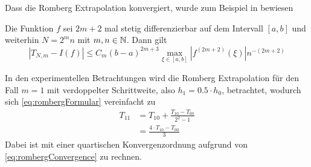 Dass die Romberg Extrapolation konvergiert, wurde zum Beispiel in \cite{von1993short} bewiesen 
\begin{theorem}\label{thm:rombergConvergence}
 Die Funktion $f$ sei $2m+2$ mal stetig differenzierbar auf dem Intervall $[a,b]$ und weiterhin $N=2^mn$ mit $m,n\in \mathbb{N}$. Dann gilt
 \begin{equation}\label{eq:rombergConvergence}
  |T_{N,m} - I(f)| \leq C_m(b-a)^{2m+3}\max_{\xi \in[a,b]}|f^{(2m+2)}(\xi)|n^{-(2m+2)}
 \end{equation}
\end{theorem}

In den experimentellen Betrachtungen wird die Romberg Extrapolation für den Fall $m=1$ mit verdoppelter Schrittweite, also $h_1=0.5\cdot h_0$, betrachtet, wodurch sich \eqref{eq:rombergFormular} vereinfacht zu
\[
\begin{aligned}
 T_{11} &= T_{10} + \frac{T_{10}-T_{00}}{2^2-1}\\
	  &= \frac{4\cdot T_{10}-T_{00}}{3}
 \end{aligned}
\]
Dabei ist mit einer quartischen Konvergenzordnung aufgrund von \eqref{eq:rombergConvergence} zu rechnen.

